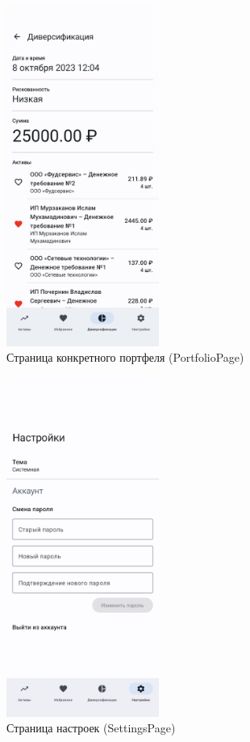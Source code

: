 \documentclass[a4paper, 14pt]{article}
\begin{document}
\begin{figure}[H]
    \centering
    \includegraphics[width=5cm]{resources/12.png}
    \caption{Страница конкретного портфеля (PortfolioPage)}
\end{figure}

\begin{figure}[H]
    \centering
    \includegraphics[width=5cm]{resources/13.png}
    \caption{Страница настроек (SettingsPage)}
\end{figure}
\end{document}
